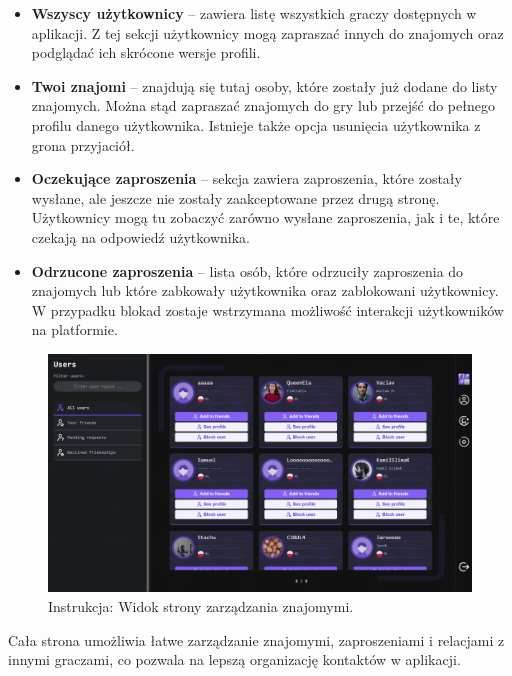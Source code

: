 \documentclass[12pt,a4paper]{article}
\begin{document}
\begin{itemize}
    \item \textbf{Wszyscy użytkownicy} – zawiera listę wszystkich graczy dostępnych w aplikacji. Z tej sekcji użytkownicy mogą zapraszać innych do znajomych oraz podglądać ich skrócone wersje profili.

    \item \textbf{Twoi znajomi} – znajdują się tutaj osoby, które zostały już dodane do listy znajomych. Można stąd zapraszać znajomych do gry lub przejść do pełnego profilu danego użytkownika. Istnieje także opcja usunięcia użytkownika z grona przyjaciół.

    \item \textbf{Oczekujące zaproszenia} – sekcja zawiera zaproszenia, które zostały wysłane, ale jeszcze nie zostały zaakceptowane przez drugą stronę. Użytkownicy mogą tu zobaczyć zarówno wysłane zaproszenia, jak i te, które czekają na odpowiedź użytkownika.

    \item \textbf{Odrzucone zaproszenia} – lista osób, które odrzuciły zaproszenia do znajomych lub które zabkowały użytkownika oraz zablokowani użytkownicy. W przypadku blokad zostaje wstrzymana możliwość interakcji użytkowników na platformie.

\end{itemize}

\vspace{0.5cm}
\begin{figure}[h!]
    \centering
    \includegraphics[width=1\textwidth]{images/ins_users.png}
    \caption{Instrukcja: Widok strony zarządzania znajomymi.}
\end{figure}
\vspace{0.5cm}

\noindent
Cała strona umożliwia łatwe zarządzanie znajomymi, zaproszeniami i relacjami z innymi graczami, co pozwala na lepszą organizację kontaktów w aplikacji.
\end{document}
